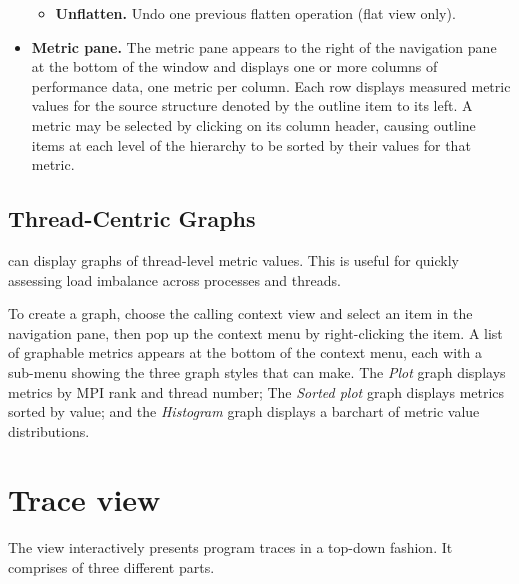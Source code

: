 \documentclass[english]{article}
\begin{document}
\begin{itemize}
\begin{itemize}
\item \textbf{Unflatten.} Undo one previous flatten operation (flat view only).

\end{itemize}

\item  \textbf{Metric pane.}
The metric pane appears to the right of the navigation pane at the bottom of the window
and displays one or more columns of performance data, one metric per column.
Each row displays measured metric values for the source structure denoted by the outline item to its left.
A metric may be selected by clicking on its column header,
causing outline items at each level of the hierarchy to be sorted by their values for that metric.

\end{itemize}


\subsection{Thread-Centric Graphs}

 can display graphs of thread-level metric values.
This is useful for quickly assessing load imbalance across processes and threads.

To create a graph,
choose the calling context view and select an item in the navigation pane,
then pop up the context menu by right-clicking the item.
A list of graphable metrics appears at the bottom of the context menu,
each with a sub-menu showing the three graph styles that  can make.
The \emph{Plot} graph displays metrics by MPI rank and thread number;
The \emph{Sorted plot} graph displays metrics sorted by value;
and the \emph{Histogram} graph displays a barchart of metric value distributions.






\section{Trace view}

The view interactively presents program traces in a top-down fashion.
It comprises of three different parts.
\end{document}
